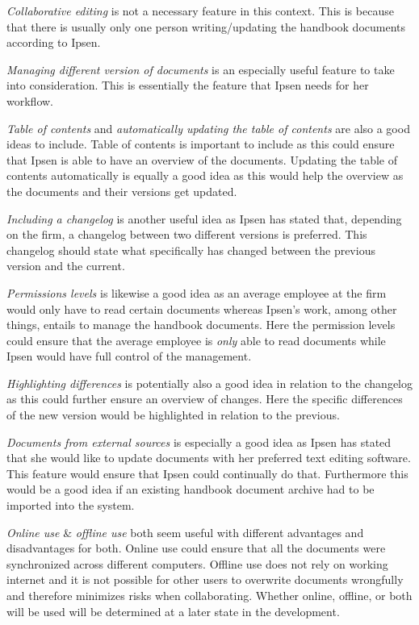 \textit{Collaborative editing} is not a necessary feature in this context.
This is because that there is usually only one person writing/updating the handbook documents according to Ipsen.

\textit{Managing different version of documents} is an especially useful feature to take into consideration.
This is essentially the feature that Ipsen needs for her workflow.

\textit{Table of contents} and \textit{automatically updating the table of contents} are also a good ideas to include.
Table of contents is important to include as this could ensure that Ipsen is able to have an overview of the documents.
Updating the table of contents automatically is equally a good idea as this would help the overview as the documents and their versions get updated.

\textit{Including a changelog} is another useful idea as Ipsen has stated that, depending on the firm, a changelog between two different versions is preferred.
This changelog should state what specifically has changed between the previous version and the current.

\textit{Permissions levels} is likewise a good idea as an average employee at the firm would only have to read certain documents whereas Ipsen's work, among other things, entails to manage the handbook documents.
Here the permission levels could ensure that the average employee is \textit{only} able to read documents while Ipsen would have full control of the management.

\textit{Highlighting differences} is potentially also a good idea in relation to the changelog as this could further ensure an overview of changes.
Here the specific differences of the new version would be highlighted in relation to the previous.

\textit{Documents from external sources} is especially a good idea as Ipsen has stated that she would like to update documents with her preferred text editing software.
This feature would ensure that Ipsen could continually do that.
Furthermore this would be a good idea if an existing handbook document archive had to be imported into the system.

\textit{Online use} \& \textit{offline use} both seem useful with different advantages and disadvantages for both.
Online use could ensure that all the documents were synchronized across different computers.
Offline use does not rely on working internet and it is not possible for other users to overwrite documents wrongfully and therefore minimizes risks when collaborating.
Whether online, offline, or both will be used will be determined at a later state in the development.

